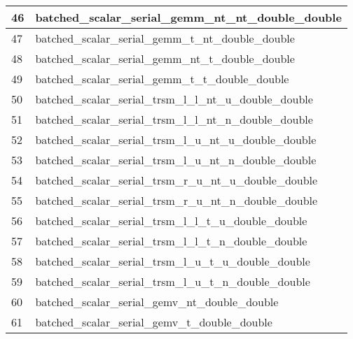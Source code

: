 \begin{table}[!htbp]
{            \begin{tabular}{|>{\columncolor[HTML]{34FF34}}l |l|}
            \hline
            46                         & batched\_scalar\_serial\_gemm\_nt\_nt\_double\_double               \\ \hline
            47                         & batched\_scalar\_serial\_gemm\_t\_nt\_double\_double                \\ \hline
            48                         & batched\_scalar\_serial\_gemm\_nt\_t\_double\_double                \\ \hline
            49                         & batched\_scalar\_serial\_gemm\_t\_t\_double\_double                 \\ \hline
            50                         & batched\_scalar\_serial\_trsm\_l\_l\_nt\_u\_double\_double          \\ \hline
            \cellcolor[HTML]{D1B3FF}51 & batched\_scalar\_serial\_trsm\_l\_l\_nt\_n\_double\_double          \\ \hline
            52                         & batched\_scalar\_serial\_trsm\_l\_u\_nt\_u\_double\_double          \\ \hline
            \cellcolor[HTML]{D1B3FF}53 & batched\_scalar\_serial\_trsm\_l\_u\_nt\_n\_double\_double          \\ \hline
            54                         & batched\_scalar\_serial\_trsm\_r\_u\_nt\_u\_double\_double          \\ \hline
            \cellcolor[HTML]{D1B3FF}55 & batched\_scalar\_serial\_trsm\_r\_u\_nt\_n\_double\_double          \\ \hline
            56                         & batched\_scalar\_serial\_trsm\_l\_l\_t\_u\_double\_double           \\ \hline
            \cellcolor[HTML]{D1B3FF}57 & batched\_scalar\_serial\_trsm\_l\_l\_t\_n\_double\_double           \\ \hline
            58                         & batched\_scalar\_serial\_trsm\_l\_u\_t\_u\_double\_double           \\ \hline
            \cellcolor[HTML]{D1B3FF}59 & batched\_scalar\_serial\_trsm\_l\_u\_t\_n\_double\_double           \\ \hline
            60                         & batched\_scalar\_serial\_gemv\_nt\_double\_double                   \\ \hline
            61                         & batched\_scalar\_serial\_gemv\_t\_double\_double                    \\ \hline

\end{tabular}}
\end{table}
